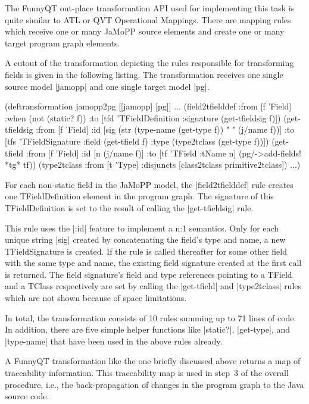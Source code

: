 \documentclass[submission]{eptcs}
\newcommand{\code}{\clojureinline}
\begin{document}
The FunnyQT out-place transformation API used for implementing this task is
quite similar to ATL or QVT Operational Mappings.  There are mapping rules
which receive one or many JaMoPP source elements and create one or many target
program graph elements.

A cutout of the transformation depicting the rules responsible for transforming
fields is given in the following listing.  The transformation receives one
single source model \code|jamopp| and one single target model \code|pg|.

\begin{clojurecode}
(deftransformation jamopp2pg [[jamopp] [pg]]
  ...
  (field2tfielddef
   :from [f 'Field]
   :when (not (static? f))
   :to   [tfd 'TFieldDefinition {:signature (get-tfieldsig f)}])
  (get-tfieldsig
   :from [f 'Field]
   :id   [sig (str (type-name (get-type f)) " " (j/name f))]
   :to   [tfs 'TFieldSignature {:field (get-tfield f)
                                :type  (type2tclass (get-type f))}])
  (get-tfield
   :from [f 'Field]
   :id   [n (j/name f)]
   :to   [tf 'TField {:tName n}]
   (pg/->add-fields! *tg* tf))
  (type2tclass
   :from [t 'Type]
   :disjuncts [class2tclass primitive2tclass])
  ...)
\end{clojurecode}

For each non-static field in the JaMoPP model, the \code|field2tfielddef| rule
creates one \textsf{TFieldDefinition} element in the program graph.  The
signature of this \textsf{TFieldDefinition} is set to the result of calling the
\code|get-tfieldsig| rule.

This rule uses the \code|:id| feature to implement a n:1 semantics.  Only for
each unique string \code|sig| created by concatenating the field's type and
name, a new \textsf{TFieldSignature} is created.  If the rule is called
thereafter for some other field with the same type and name, the existing field
signature created at the first call is returned.  The field signature's
\textsf{field} and \textsf{type} references pointing to a \textsf{TField} and a
\textsf{TClass} respectively are set by calling the \code|get-tfield| and
\code|type2tclass| rules which are not shown because of space limitations.

In total, the transformation consists of 10 rules summing up to 71 lines of
code.  In addition, there are five simple helper functions like \code|static?|,
\code|get-type|, and \code|type-name| that have been used in the above rules
already.

A FunnyQT transformation like the one briefly discussed above returns a map of
traceability information.  This traceability map is used in step~3 of the
overall procedure, i.e., the back-propagation of changes in the program graph
to the Java source code.
\end{document}
